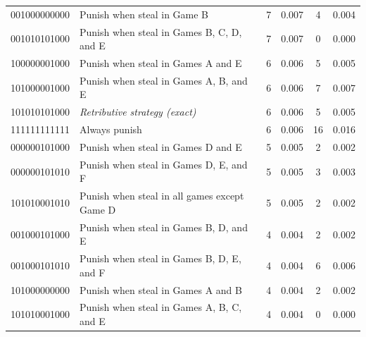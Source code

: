 \documentclass[
  english,
  man, donotrepeattitle,floatsintext]{apa6}
\begin{document}
\begin{table}[H]
\begin{center}
\begin{threeparttable}
{\begin{tabular}{llcccc}
001000000000 & Punish when steal in Game B & 7 & 0.007 & 4 & 0.004\\
001010101000 & Punish when steal in Games B, C, D, and E & 7 & 0.007 & 0 & 0.000\\
100000001000 & Punish when steal in Games A and E & 6 & 0.006 & 5 & 0.005\\
101000001000 & Punish when steal in Games A, B, and E & 6 & 0.006 & 7 & 0.007\\
101010101000 & \textit{Retributive strategy (exact)} & 6 & 0.006 & 5 & 0.005\\
111111111111 & Always punish & 6 & 0.006 & 16 & 0.016\\
000000101000 & Punish when steal in Games D and E & 5 & 0.005 & 2 & 0.002\\
000000101010 & Punish when steal in Games D, E, and F & 5 & 0.005 & 3 & 0.003\\
101010001010 & Punish when steal in all games except Game D & 5 & 0.005 & 2 & 0.002\\
001000101000 & Punish when steal in Games B, D, and E & 4 & 0.004 & 2 & 0.002\\
001000101010 & Punish when steal in Games B, D, E, and F & 4 & 0.004 & 6 & 0.006\\
101000000000 & Punish when steal in Games A and B & 4 & 0.004 & 2 & 0.002\\
101010001000 & Punish when steal in Games A, B, C, and E & 4 & 0.004 & 0 & 0.000\\
\bottomrule
\end{tabular}

}

\end{threeparttable}
\end{center}

\end{table}

\newpage
\end{document}

